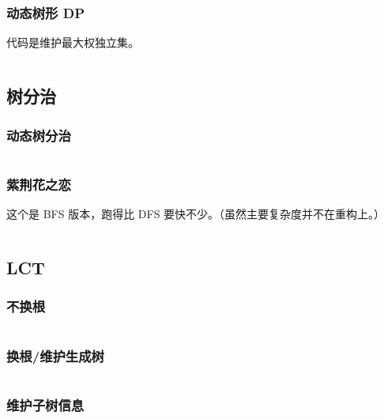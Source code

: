 \documentclass[a4paper, twoside]{article}
\begin{document}
\begin{multicols}{2}
				\subsubsection[动态树形 DP（最大权独立集）]{动态树形 DP}
					代码是维护最大权独立集。
					\inputminted{cpp}{../src/datastructure/动态树形DP.cpp}
				
			\subsection{树分治}

				
				\subsubsection{动态树分治}
					\inputminted{cpp}{../src/datastructure/动态树分治.cpp}

				\subsubsection{紫荆花之恋}

					这个是 BFS 版本，跑得比 DFS 要快不少。（虽然主要复杂度并不在重构上。）
					\inputminted{cpp}{../src/datastructure/紫荆花之恋.cpp}
	
			\subsection[LCT 动态树]{LCT}
				\subsubsection[不换根（弹飞绵羊）]{不换根}
					\inputminted{cpp}{../src/datastructure/LCT(不换根).cpp}
			
				\subsubsection{换根/维护生成树}
					\inputminted{cpp}{../src/datastructure/LCT(换根).cpp}

				\subsubsection{维护子树信息}
					\inputminted{cpp}{../src/datastructure/LCT维护子树信息.cpp}
					

\end{multicols}
\end{document}
